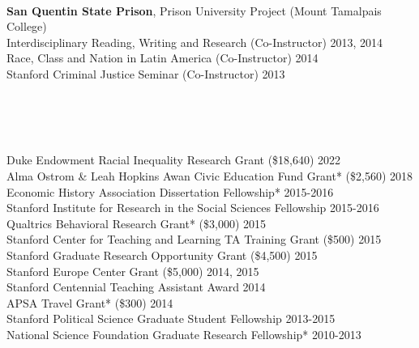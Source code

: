 \documentclass[11pt]{article}
\begin{document}
			\begin{minipage}[t]{.21\textwidth}
				\so{ } \\
			\end{minipage}
			\begin{minipage}[t]{.79\textwidth}
		\vspace{.125in}
		\textbf{San Quentin State Prison}, Prison University Project (Mount Tamalpais College) \\
			\hspace*{.1in} Interdisciplinary Reading, Writing and Research (Co-Instructor) \hfill  2013, 2014 \\
			\hspace*{.1in} Race, Class and Nation in Latin America (Co-Instructor) \hfill  2014 \\
			\hspace*{.1in} Stanford Criminal Justice Seminar (Co-Instructor)  \hfill  2013 \\

\end{minipage}





\vspace{.2in}
\begin{minipage}[t]{.21\textwidth}
   \\
	 \\
	 \\
\end{minipage}
\begin{minipage}[t]{.79\textwidth}

	Duke Endowment Racial Inequality Research Grant (\$18,640) \hfill 2022 \\
	Alma Ostrom \& Leah Hopkins Awan Civic Education Fund Grant* (\$2,560) \hfill 2018 \\

	\vspace{-.1in}
  Economic History Association Dissertation Fellowship* 				\hfill 2015-2016 \\
  Stanford Institute for Research in the Social Sciences Fellowship 	\hfill 2015-2016 \\
  Qualtrics Behavioral Research Grant* (\$3,000)  					\hfill 2015 \\
  Stanford Center for Teaching and Learning TA Training Grant (\$500) 	\hfill 2015\\
  Stanford Graduate Research Opportunity Grant (\$4,500) 				\hfill 2015 \\
	Stanford Europe Center Grant (\$5,000)  								\hfill 2014, 2015  \\
  Stanford Centennial Teaching Assistant Award							\hfill	 2014 \\
	APSA Travel Grant* (\$300)												\hfill 2014  \\
	Stanford Political Science Graduate Student Fellowship					\hfill 2013-2015\\
	National Science Foundation Graduate Research Fellowship*	 		\hfill 2010-2013
\end{minipage}
\end{document}
